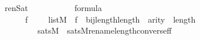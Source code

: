 \begin{isabelle}
\isamarkupfalse%
\ renSat\ {\isacharcolon}\ \isanewline
\ \ \ {\isachardoublequoteopen}{\isasymphi}{\isachardoublequoteclose}\isanewline
\ \ \ {\isachardoublequoteopen}{\isasymphi}\ {\isasymin}\ formula{\isachardoublequoteclose}\isanewline
\ \ \ \ {\isachardoublequoteopen}{\isasymAnd}\ {\isasymrho}\ f\ {\isachardot}\ {\isasymlbrakk}\ {\isasymrho}\ {\isasymin}\ list{\isacharparenleft}M{\isacharparenright}\ {\isacharsemicolon}\ f\ {\isasymin}\ bij{\isacharparenleft}length{\isacharparenleft}{\isasymrho}{\isacharparenright}{\isacharcomma}length{\isacharparenleft}{\isasymrho}{\isacharparenright}{\isacharparenright}\ {\isacharsemicolon}\ arity{\isacharparenleft}{\isasymphi}{\isacharparenright}\ {\isasymle}\ length{\isacharparenleft}{\isasymrho}{\isacharparenright}\ {\isasymrbrakk}\ {\isasymLongrightarrow}\isanewline
\ \ \ \ \ \ \ \ \ sats{\isacharparenleft}M{\isacharcomma}{\isasymphi}{\isacharcomma}{\isasymrho}{\isacharparenright}\ {\isasymlongleftrightarrow}\ sats{\isacharparenleft}M{\isacharcomma}rename{\isacharparenleft}{\isasymphi}{\isacharparenright}{\isacharbackquote}length{\isacharparenleft}{\isasymrho}{\isacharparenright}{\isacharbackquote}converse{\isacharparenleft}f{\isacharparenright}{\isacharcomma}{\isasymrho}{\isasymcirc}f{\isacharparenright}{\isacharparenright}{\isachardoublequoteclose}
\end{isabelle}


